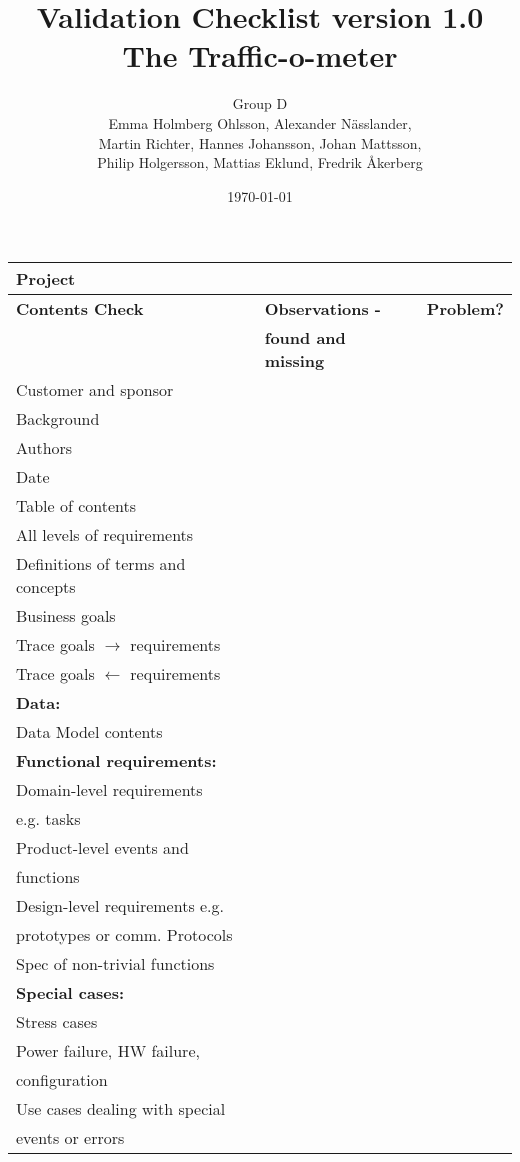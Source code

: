 \documentclass[a4paper]{article}
\title{Validation Checklist version 1.0\\ The Traffic-o-meter}
\author{Group D\\ Emma Holmberg Ohlsson, Alexander Nässlander,\\Martin Richter, Hannes Johansson, Johan Mattsson,\\Philip Holgersson, Mattias Eklund, Fredrik Åkerberg}
\date{\today}
\begin{document}
	\maketitle
	\thispagestyle{empty}
	\setcounter{page}{0}

	\begin{tabular}{|l|l|l|} \hline 
		\multicolumn{3}{|l|}{\textbf{Project}} \\ \hline \hline
		\textbf{Contents Check}	& \textbf{Observations - }	& \textbf{Problem?} \\
			& \textbf{found and missing}	&	\\ \hline
		Customer and sponsor & & \\ \hline
		Background	&	&	\\ \hline
		Authors &	& \\ \hline
		Date &	& \\ \hline
		Table of contents	&	& \\ \hline
		All levels of requirements	&	& \\ \hline
		Definitions of terms and concepts	&	& \\ \hline
		Business goals	&	&	\\ \hline
		Trace goals \(\rightarrow\) requirements	&	&	\\ \hline
		Trace goals \(\leftarrow\) requirements	&	&	\\ \hline
		\textbf{Data:}	&	&	\\ 
		Data Model contents	&	&	\\ \hline
		\textbf{Functional requirements:}	&	&	\\
		Domain-level requirements	&	&	\\ 
		e.g. tasks	&	&	\\ \hline
		Product-level events and	&	&	\\
		functions	&	&	\\ \hline
		Design-level requirements e.g.	&	&	\\
		prototypes or comm. Protocols	&	&	\\ \hline
		Spec of non-trivial functions	&	&	\\ \hline
		\textbf{Special cases:}	&	&	\\
		Stress cases	&	&	\\ \hline
		Power failure, HW failure,	&	&	\\
		configuration	&	&	\\ \hline
		Use cases dealing with special	&	&	\\
		events or errors	&	&	\\ \hline

\end{tabular}
\end{document}
